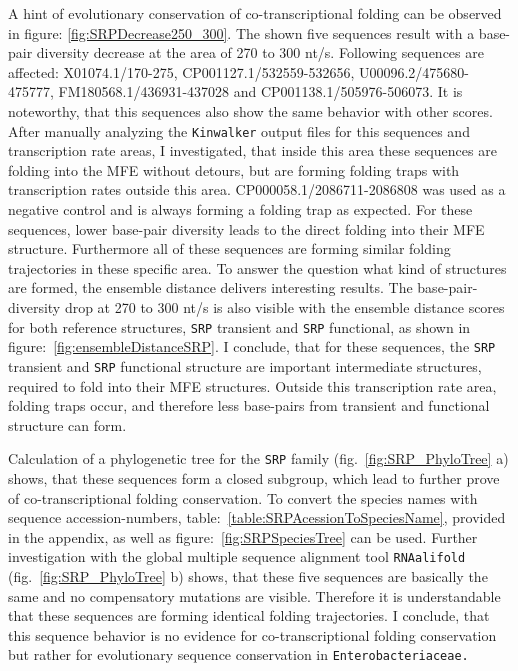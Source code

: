 \documentclass[ twoside,openright,titlepage,numbers=noenddot,headinclude,%
                footinclude=false, cleardoublepage=empty,abstractoff, %
                BCOR=5mm,paper=a4,fontsize=11pt,%
                ngerman,american,%
                ]{scrreprt}
\begin{document}
A hint of evolutionary conservation of co-transcriptional folding can be
observed in figure: \ref{fig:SRPDecrease250_300}. The shown five sequences
result with a base-pair diversity decrease at the area of 270 to 300 nt/s.
Following sequences are affected: X01074.1/170-275,
CP001127.1/532559-532656, U00096.2/475680-475777, FM180568.1/436931-437028
and CP001138.1/505976-506073. It is noteworthy, that this sequences also
show the same behavior with other scores. After manually analyzing the
\texttt{Kinwalker} output files for this sequences and transcription rate
areas, I investigated, that inside this area these sequences are folding
into the MFE without detours, but are forming folding traps with
transcription rates outside this area. CP000058.1/2086711-2086808 was used
as a negative control and is always forming a folding trap as expected. For
these sequences, lower base-pair diversity leads to the direct folding into
their MFE structure. Furthermore all of these sequences are forming similar
folding trajectories in these specific area. To answer the question what
kind of structures are formed, the ensemble distance delivers interesting
results. The base-pair-diversity drop at 270 to 300 nt/s is also visible with
the ensemble distance scores for both reference structures, \texttt{SRP} transient
and \texttt{SRP} functional, as shown in figure:~\ref{fig:ensembleDistanceSRP}. I
conclude, that for these sequences, the \texttt{SRP} transient and \texttt{SRP} functional
structure are important intermediate structures, required to fold into
their MFE structures. Outside this transcription rate area, folding traps
occur, and therefore less base-pairs from transient and functional
structure can form.

Calculation of a phylogenetic tree for the \texttt{SRP} family (fig.~\ref{fig:SRP_PhyloTree} a) shows, that these sequences form a closed subgroup, which lead to further prove of co-transcriptional folding conservation. To convert the species names with sequence accession-numbers, table:~\ref{table:SRPAcessionToSpeciesName}, provided in the appendix, as well as figure:~\ref{fig:SRPSpeciesTree} can be used. Further investigation with the global multiple sequence alignment tool \texttt{RNAalifold} (fig.~\ref{fig:SRP_PhyloTree} b) shows, that these five sequences are basically the same and no compensatory mutations are visible. Therefore it is understandable that these sequences are forming identical folding trajectories. I conclude, that this sequence behavior is no evidence for co-transcriptional folding conservation but rather for evolutionary sequence conservation in \texttt{Enterobacteriaceae.} 
\end{document}
